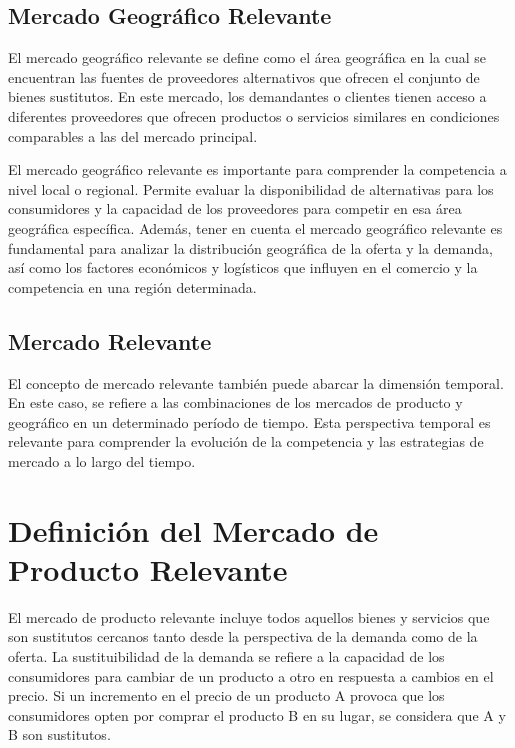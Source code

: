 \documentclass[
  a4paper,
]{article}
\begin{document}
\hypertarget{mercado-geogruxe1fico-relevante}{%
\subsection{Mercado Geográfico
Relevante}\label{mercado-geogruxe1fico-relevante}}

El mercado geográfico relevante se define como el área geográfica en la
cual se encuentran las fuentes de proveedores alternativos que ofrecen
el conjunto de bienes sustitutos. En este mercado, los demandantes o
clientes tienen acceso a diferentes proveedores que ofrecen productos o
servicios similares en condiciones comparables a las del mercado
principal.

El mercado geográfico relevante es importante para comprender la
competencia a nivel local o regional. Permite evaluar la disponibilidad
de alternativas para los consumidores y la capacidad de los proveedores
para competir en esa área geográfica específica. Además, tener en cuenta
el mercado geográfico relevante es fundamental para analizar la
distribución geográfica de la oferta y la demanda, así como los factores
económicos y logísticos que influyen en el comercio y la competencia en
una región determinada.

\hypertarget{mercado-relevante}{%
\subsection{Mercado Relevante}\label{mercado-relevante}}

El concepto de mercado relevante también puede abarcar la dimensión
temporal. En este caso, se refiere a las combinaciones de los mercados
de producto y geográfico en un determinado período de tiempo. Esta
perspectiva temporal es relevante para comprender la evolución de la
competencia y las estrategias de mercado a lo largo del tiempo.

\hypertarget{definiciuxf3n-del-mercado-de-producto-relevante}{%
\section{Definición del Mercado de Producto
Relevante}\label{definiciuxf3n-del-mercado-de-producto-relevante}}

El mercado de producto relevante incluye todos aquellos bienes y
servicios que son sustitutos cercanos tanto desde la perspectiva de la
demanda como de la oferta. La sustituibilidad de la demanda se refiere a
la capacidad de los consumidores para cambiar de un producto a otro en
respuesta a cambios en el precio. Si un incremento en el precio de un
producto A provoca que los consumidores opten por comprar el producto B
en su lugar, se considera que A y B son sustitutos.
\end{document}
